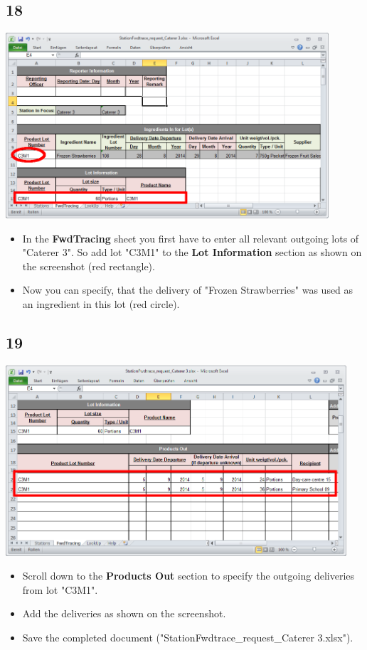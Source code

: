 \documentclass{beamer}
\begin{document}
\subsection{18}
\begin{frame}
	\begin{center}
  		\includegraphics[width=0.9\textwidth]{18.png}
	\end{center}
	\begin{itemize}
		\item In the \textbf{FwdTracing} sheet you first have to enter all relevant outgoing lots of "Caterer 3". So add lot "C3M1" to the \textbf{Lot Information} section as shown on the screenshot (red rectangle).
		\item Now you can specify, that the delivery of "Frozen Strawberries" was used as an ingredient in this lot (red circle).
	\end{itemize}
\end{frame}

\subsection{19}
\begin{frame}
	\begin{center}
  		\includegraphics[width=0.95\textwidth]{19.png}
	\end{center}
	\begin{itemize}
		\item Scroll down to the \textbf{Products Out} section to specify the outgoing deliveries from lot "C3M1".
		\item Add the deliveries as shown on the screenshot.
		\item Save the completed document ("StationFwdtrace\_request\_Caterer 3.xlsx").
	\end{itemize}
\end{frame}
\end{document}
